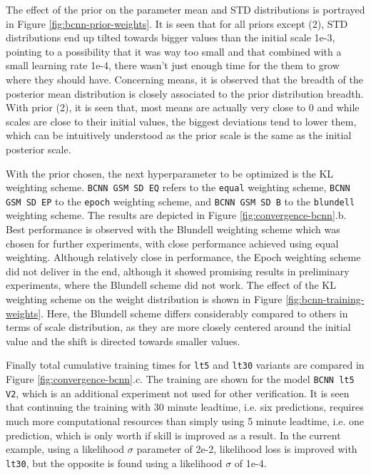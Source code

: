 The effect of the prior on the parameter mean and STD distributions is portrayed in Figure \ref{fig:bcnn-prior-weights}. It is seen that for all priors except (2), STD distributions end up tilted towards bigger values than the initial scale 1e-3, pointing to a possibility that it was way too small and that combined with a small learning rate 1e-4, there wasn't just enough time for the them to grow where they should have. Concerning means, it is observed that the breadth of the posterior mean distribution is closely associated to the prior distribution breadth. With prior (2), it is seen that, most means are actually very close to 0 and while scales are close to their initial values, the biggest deviations tend to lower them, which can be intuitively understood as the prior scale is the same as the initial posterior scale.  

With the prior chosen, the next hyperparameter to be optimized is the KL weighting scheme. \texttt{BCNN GSM SD EQ} refers to the \texttt{equal} weighting scheme, \texttt{BCNN GSM SD EP} to the \texttt{epoch} weighting scheme, and \texttt{BCNN GSM SD B} to the \texttt{blundell} weighting scheme. The results are depicted in Figure \ref{fig:convergence-bcnn}.b. Best performance is observed with the Blundell weighting scheme which was chosen for further experiments, with close performance achieved using equal weighting. Although relatively close in performance, the Epoch weighting scheme did not deliver in the end, although it showed promising results in preliminary experiments, where the Blundell scheme did not work. The effect of the KL weighting scheme on the weight distribution is shown in Figure \ref{fig:bcnn-training-weights}. Here, the Blundell scheme differs considerably compared to others in terms of scale distribution, as they are more closely centered around the initial value and the shift is directed towards smaller values. 

Finally total cumulative training times for \texttt{lt5} and \texttt{lt30} variants are compared in Figure \ref{fig:convergence-bcnn}.c. The training are shown for the model \texttt{BCNN lt5 V2}, which is an additional experiment not used for other verification. It is seen that continuing the training with 30 minute leadtime, i.e. six predictions, requires much more computational resources than simply using 5 minute leadtime, i.e. one prediction, which is only worth if skill is improved as a result. In the current example, using a likelihood $\sigma$ parameter of 2e-2, likelihood loss is improved with \texttt{lt30}, but the opposite is found using a likelihood $\sigma$ of 1e-4.

